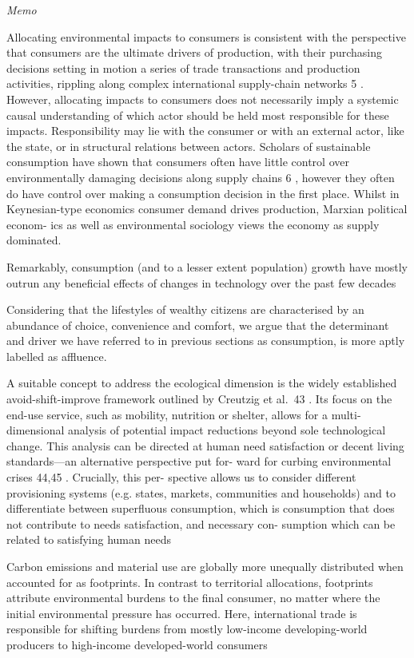 \documentclass[
]{book}
\begin{document}
\emph{Memo}

Allocating environmental impacts to consumers is consistent
with the perspective that consumers are the ultimate drivers of
production, with their purchasing decisions setting in motion a
series of trade transactions and production activities, rippling
along complex international supply-chain networks 5 . However,
allocating impacts to consumers does not necessarily imply a
systemic causal understanding of which actor should be held
most responsible for these impacts. Responsibility may lie with
the consumer or with an external actor, like the state, or in
structural relations between actors. Scholars of sustainable
consumption have shown that consumers often have little control
over environmentally damaging decisions along supply chains 6 ,
however they often do have control over making a consumption
decision in the first place. Whilst in Keynesian-type economics
consumer demand drives production, Marxian political econom-
ics as well as environmental sociology views the economy as
supply dominated.

Remarkably, consumption (and to a lesser extent population)
growth have mostly outrun any beneficial effects of changes in
technology over the past few decades

Considering that the lifestyles of
wealthy citizens are characterised by an abundance of choice,
convenience and comfort, we argue that the determinant and
driver we have referred to in previous sections as consumption, is
more aptly labelled as affluence.

A suitable concept to address the ecological dimension
is the widely established avoid-shift-improve framework outlined
by Creutzig et al.~43 . Its focus on the end-use service, such as
mobility, nutrition or shelter, allows for a multi-dimensional
analysis of potential impact reductions beyond sole technological
change. This analysis can be directed at human need satisfaction
or decent living standards---an alternative perspective put for-
ward for curbing environmental crises 44,45 . Crucially, this per-
spective allows us to consider different provisioning systems (e.g.
states, markets, communities and households) and to differentiate
between superfluous consumption, which is consumption that
does not contribute to needs satisfaction, and necessary con-
sumption which can be related to satisfying human needs

Carbon emissions and
material use are globally more unequally distributed when
accounted for as footprints. In contrast to territorial allocations,
footprints attribute environmental burdens to the final consumer,
no matter where the initial environmental pressure has occurred.
Here, international trade is responsible for shifting burdens from
mostly low-income developing-world producers to high-income
developed-world consumers
\end{document}
